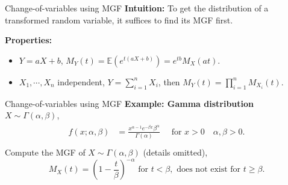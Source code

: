 \documentclass [aspectratio=169]{beamer}
\begin{document}
\begin{frame}{Change-of-variables using MGF}
\textbf{Intuition:} To get the distribution of a transformed random variable, it suffices to find its MGF first.\\
\vspace{0.1in}

     \textbf{Properties:}\\
     \begin{itemize}
         \item $Y = aX + b$, $M_Y(t) = \mathbb{E}(e^{t(aX + b)}) = e^{tb}M_X(at)$.
         \item $X_1, \cdots, X_n$ independent, $Y = \sum_{i = 1}^n X_i$, then $M_{Y}(t) = \prod_{i=1}^n M_{X_i}(t)$. 
     \end{itemize}
     \vspace{0.1in}
\end{frame}

\begin{frame}{Change-of-variables using MGF}
    \textbf{Example: Gamma distribution}\\
    \vspace{0.1in}
    $X \sim \Gamma(\alpha, \beta)$, 
    \begin{equation*}
    \begin{aligned}
   {\displaystyle {\begin{aligned}f(x;\alpha ,\beta )&={\frac {x^{\alpha -1}e^{-\beta x}\beta ^{\alpha }}{\Gamma (\alpha )}}\quad {\text{ for }}x>0\quad \alpha ,\beta >0.\\[6pt]\end{aligned}}}
    \end{aligned}
\end{equation*}
Compute the MGF of $X \sim \Gamma(\alpha, \beta)$ (details omitted), 
\begin{equation*}
    M_X(t) = \left(1-{\frac {t}{\beta }}\right)^{-\alpha }{\text{ for }}t<\beta, \text{ does not exist for } t \ge \beta.
\end{equation*}
\end{frame}
\end{document}
